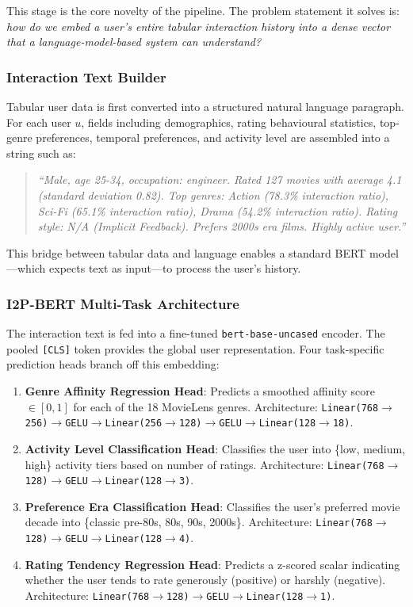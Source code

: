 \documentclass[11pt,a4paper]{article}
\begin{document}
This stage is the core novelty of the pipeline. The problem statement it solves is: \textit{how do we embed a user's entire tabular interaction history into a dense vector that a language-model-based system can understand?}

\subsubsection{Interaction Text Builder}
Tabular user data is first converted into a structured natural language paragraph. For each user $u$, fields including demographics, rating behavioural statistics, top-genre preferences, temporal preferences, and activity level are assembled into a string such as:

\begin{quote}
  \textit{``Male, age 25-34, occupation: engineer. Rated 127 movies with average 4.1 (standard deviation 0.82). Top genres: Action (78.3\% interaction ratio), Sci-Fi (65.1\% interaction ratio), Drama (54.2\% interaction ratio). Rating style: N/A (Implicit Feedback). Prefers 2000s era films. Highly active user.''}
\end{quote}

This bridge between tabular data and language enables a standard BERT model—which expects text as input—to process the user's history.

\subsubsection{I2P-BERT Multi-Task Architecture}
The interaction text is fed into a fine-tuned \texttt{bert-base-uncased} encoder. The pooled \texttt{[CLS]} token provides the global user representation. Four task-specific prediction heads branch off this embedding:

\begin{enumerate}[leftmargin=1.5em]
  \item \textbf{Genre Affinity Regression Head}: Predicts a smoothed affinity score $\in [0,1]$ for each of the 18 MovieLens genres. Architecture: \texttt{Linear(768$\to$256)$\to$GELU$\to$Linear(256$\to$128)$\to$GELU$\to$Linear(128$\to$18)}.
  \item \textbf{Activity Level Classification Head}: Classifies the user into \{low, medium, high\} activity tiers based on number of ratings. Architecture: \texttt{Linear(768$\to$128)$\to$GELU$\to$Linear(128$\to$3)}.
  \item \textbf{Preference Era Classification Head}: Classifies the user's preferred movie decade into \{classic pre-80s, 80s, 90s, 2000s\}. Architecture: \texttt{Linear(768$\to$128)$\to$GELU$\to$Linear(128$\to$4)}.
  \item \textbf{Rating Tendency Regression Head}: Predicts a z-scored scalar indicating whether the user tends to rate generously (positive) or harshly (negative). Architecture: \texttt{Linear(768$\to$128)$\to$GELU$\to$Linear(128$\to$1)}.
\end{enumerate}
\end{document}
